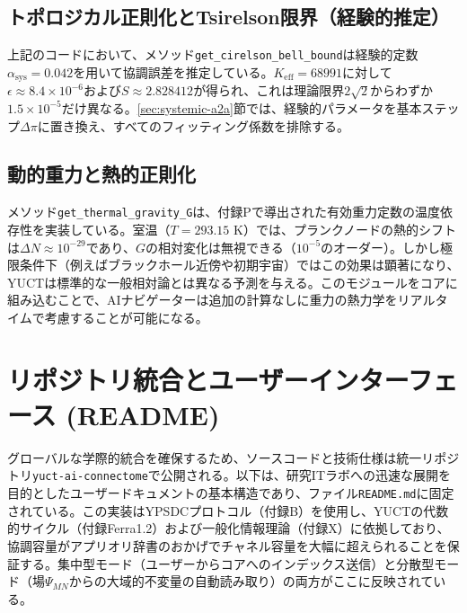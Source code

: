 \documentclass[11pt,a4paper]{article}
\begin{document}
	\subsection{トポロジカル正則化とTsirelson限界（経験的推定）}
	\label{sec:bell-regularization}
	
	上記のコードにおいて、メソッド\texttt{get\_cirelson\_bell\_bound}は経験的定数\(\alpha_{\text{sys}} = 0.042\)を用いて協調誤差を推定している。\(K_{\mathrm{eff}} = 68991\)に対して\(\epsilon \approx 8.4 \times 10^{-6}\)および\(S \approx 2.828412\)が得られ、これは理論限界\(2\sqrt{2}\)からわずか\(1.5 \times 10^{-5}\)だけ異なる。\ref{sec:systemic-a2a}節では、経験的パラメータを基本ステップ\(\Delta\pi\)に置き換え、すべてのフィッティング係数を排除する。
	
	\subsection{動的重力と熱的正則化}
	\label{subsec:thermal-gravity}
	
	メソッド\texttt{get\_thermal\_gravity\_G}は、付録Pで導出された有効重力定数の温度依存性を実装している。室温（\(T = 293.15\) K）では、プランクノードの熱的シフトは\(\Delta N \approx 10^{-29}\)であり、\(G\)の相対変化は無視できる（\(10^{-5}\)のオーダー）。しかし極限条件下（例えばブラックホール近傍や初期宇宙）ではこの効果は顕著になり、YUCTは標準的な一般相対論とは異なる予測を与える。このモジュールをコアに組み込むことで、AIナビゲーターは追加の計算なしに重力の熱力学をリアルタイムで考慮することが可能になる。
	
	\section{リポジトリ統合とユーザーインターフェース (README)}
	グローバルな学際的統合を確保するため、ソースコードと技術仕様は統一リポジトリ\texttt{yuct-ai-connectome}で公開される。以下は、研究ITラボへの迅速な展開を目的としたユーザードキュメントの基本構造であり、ファイル\texttt{README.md}に固定されている。この実装はYPSDCプロトコル（付録B）を使用し、YUCTの代数的サイクル（付録Ferra1.2）および一般化情報理論（付録X）に依拠しており、協調容量がアプリオリ辞書のおかげでチャネル容量を大幅に超えられることを保証する。集中型モード（ユーザーからコアへのインデックス送信）と分散型モード（場\(\Psi_{MN}\)からの大域的不変量の自動読み取り）の両方がここに反映されている。
	
\end{document}
